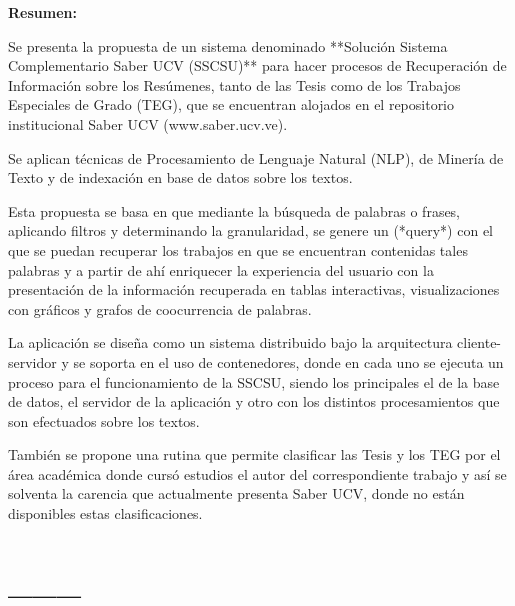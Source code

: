 \documentclass[
  10,
  spanish,
  openany]{book}
\begin{document}
\setlength{\abovedisplayskip}{-5pt}
\setlength{\abovedisplayshortskip}{-5pt}
\thispagestyle{empty}

\thispagestyle{empty}

\newpage
\thispagestyle{empty}
\large{\textbf{Resumen:}}

Se presenta la propuesta de un sistema denominado **Solución Sistema Complementario Saber UCV (SSCSU)** para hacer procesos de Recuperación de Información sobre los Resúmenes, tanto de las Tesis como de los Trabajos Especiales de Grado (TEG), que se encuentran alojados en el repositorio institucional Saber UCV (www.saber.ucv.ve).

Se aplican técnicas de Procesamiento de Lenguaje Natural (NLP), de Minería de Texto y de indexación en base de datos sobre los textos.

Esta propuesta se basa en que mediante la búsqueda de palabras o frases, aplicando filtros y determinando la granularidad, se genere un (*query*) con el que se puedan recuperar los trabajos en que se encuentran contenidas tales palabras y  a partir de ahí enriquecer la experiencia del usuario con la presentación de la información recuperada en tablas interactivas, visualizaciones con gráficos y grafos de coocurrencia de palabras.

La aplicación se diseña como un sistema distribuido bajo la arquitectura cliente-servidor y se soporta en el uso de contenedores, donde en cada uno se ejecuta un proceso para el funcionamiento de la SSCSU, siendo los principales el de la base de datos, el servidor de la aplicación y otro con los distintos procesamientos que son efectuados sobre los textos.

También se propone una rutina que permite clasificar las Tesis y los TEG por el área académica donde cursó estudios el autor del correspondiente trabajo y así se solventa la carencia que actualmente presenta Saber UCV, donde no están disponibles estas clasificaciones.

\thispagestyle{empty}

\maketitle



{
\setcounter{tocdepth}{3}
\tableofcontents
}
\listoffigures
\listoftables
\clearpage
{}

\hypertarget{section}{%
\chapter*{\_\_\_}\label{section}}
\end{document}
